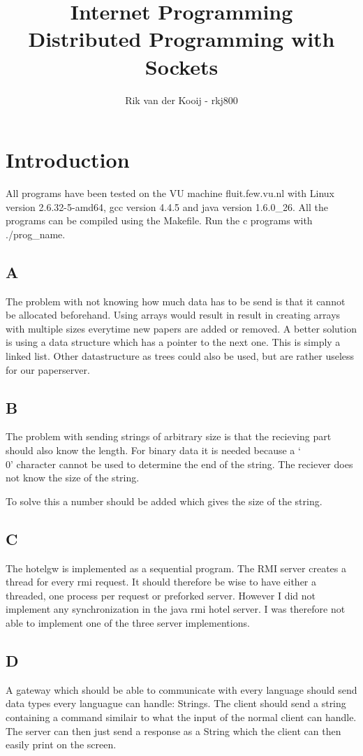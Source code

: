 \documentclass[10pt,a4paper]{article}
\title{Internet Programming\\Distributed Programming with Sockets}
\author{Rik van der Kooij - rkj800}
\begin{document}
\maketitle

\section{Introduction}
All programs have been tested on the VU machine fluit.few.vu.nl with Linux version 2.6.32-5-amd64, gcc version 4.4.5 and java version 1.6.0\_26. All the programs can be compiled using the Makefile. Run the c programs with ./prog\_name.



\subsection{A}
The problem with not knowing how much data has to be send is that it cannot be allocated beforehand. Using arrays would result in result in creating arrays with multiple sizes everytime new papers are added or removed. A better solution is using a data structure which has a pointer to the next one. This is simply a linked list. Other datastructure as trees could also be used, but are rather useless for our paperserver.

\subsection{B}
The problem with sending strings of arbitrary size is that the recieving part should also know the length. For binary data it is needed because a `\\0' character cannot be used to determine the end of the string. The reciever does not know the size of the string.

To solve this a number should be added which gives the size of the string.

\subsection{C}
The hotelgw is implemented as a sequential program. The RMI server creates a thread for every rmi request. It should therefore be wise to have either a threaded, one process per request or preforked server. However I did not implement any synchronization in the java rmi hotel server. I was therefore not able to implement one of the three server implementions.

\subsection{D}
A gateway which should be able to communicate with every language should send data types every languague can handle: Strings. The client should send a string containing a command similair to what the input of the normal client can handle. The server can then just send a response as a String which the client can then easily print on the screen.
\end{document}

